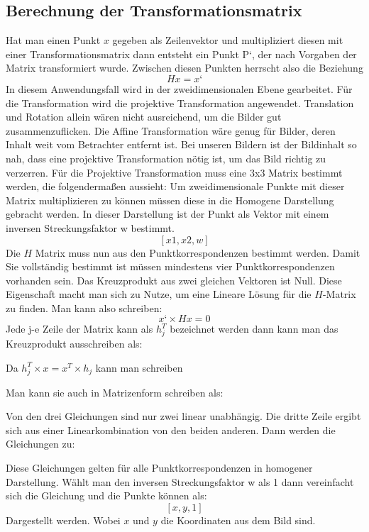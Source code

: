 \subsection{Berechnung der Transformationsmatrix }
Hat man einen Punkt $x$ gegeben als Zeilenvektor und multipliziert diesen mit einer Transformationsmatrix dann entsteht ein Punkt P‘, der nach Vorgaben der Matrix transformiert wurde. Zwischen diesen Punkten herrscht also die Beziehung
				$$H x=x‘$$
In diesem Anwendungsfall wird in der zweidimensionalen Ebene gearbeitet. Für die Transformation wird die projektive Transformation angewendet. Translation und Rotation allein wären nicht ausreichend, um die Bilder gut zusammenzuflicken. Die Affine Transformation wäre genug für Bilder, deren Inhalt weit vom Betrachter entfernt ist. Bei unseren Bildern ist der Bildinhalt so nah, dass eine projektive Transformation nötig ist, um das Bild richtig zu verzerren. Für die Projektive Transformation muss eine 3x3 Matrix bestimmt werden, die folgendermaßen aussieht:
Um zweidimensionale Punkte mit dieser Matrix multiplizieren zu können müssen diese in die Homogene Darstellung gebracht werden. In dieser Darstellung ist der Punkt als Vektor mit einem inversen Streckungsfaktor w bestimmt. 
				$$[x1, x2, w]$$
Die $H$ Matrix muss nun aus den Punktkorrespondenzen bestimmt werden. Damit Sie vollständig bestimmt ist müssen mindestens vier Punktkorrespondenzen vorhanden sein.
Das Kreuzprodukt aus zwei gleichen Vektoren ist Null. Diese Eigenschaft macht man sich zu Nutze, um eine Lineare Lösung für die $H$-Matrix zu finden. Man kann also schreiben:
			$$ x‘ \times H x=0$$
Jede j-e Zeile der Matrix kann als $h_j^T$ bezeichnet werden dann kann man das Kreuzprodukt ausschreiben als:


Da $h_j^T\times x=x^T\times h_j$ kann man schreiben
 
 
 Man kann sie auch in Matrizenform schreiben als:
 

Von den drei Gleichungen sind nur zwei linear unabhängig. Die dritte Zeile ergibt sich aus einer Linearkombination von den beiden anderen. Dann werden die Gleichungen zu:


Diese Gleichungen gelten für alle Punktkorrespondenzen in homogener Darstellung. Wählt man den inversen Streckungsfaktor w als 1 dann vereinfacht sich die Gleichung und die Punkte können als:
			$$[x, y, 1]$$
Dargestellt werden. Wobei $x$ und $y$ die Koordinaten aus dem Bild sind.

